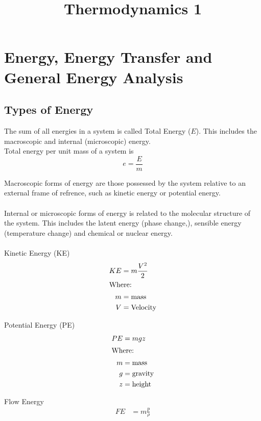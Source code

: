 \documentclass[12pt,a4paper]{article}
\begin{document}
\title{Thermodynamics 1}
\date{}
\maketitle

\newpage

\tableofcontents

\newpage

\section{Energy, Energy Transfer and General Energy Analysis}
    \subsection{Types of Energy}
        The sum of all energies in a system is called Total Energy ($E$). This includes the macroscopic and internal (microscopic) energy. \\
        Total energy per unit mass of a system is
        \[e=\frac{E}{m}\]

        Macroscopic forms of energy are those possessed by the system relative to an external frame of refrence, such as kinetic energy or potential energy. \\
        \\
        Internal or microscopic forms of energy is related to the molecular structure of the system. This includes the latent energy (phase change,), sensible energy (temperature change) and chemical or nuclear energy. \\
        \\
        Kinetic Energy (KE)
        \begin{align}
            KE&=m\frac{V^2}{2} \\
            \intertext{Where:}
            m &= \text{mass} \nonumber \\
            V&=\text{Velocity} \nonumber
        \end{align}

        Potential Energy (PE)
        \begin{align}
            PE&=mgz \\
            \intertext{Where:}
            m&=\text{mass} \nonumber \\
            g&=\text{gravity} \nonumber \\
            z&=\text{height} \nonumber 
        \end{align}

        Flow Energy
        \begin{align}
            FE &=m\frac{p}{\rho} \\
        \end{align}
\end{document}
